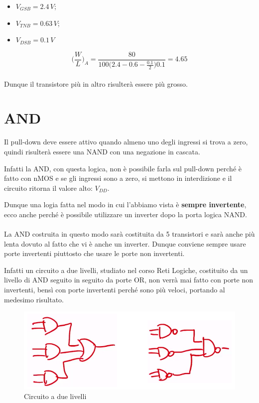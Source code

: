 \begin{itemize}
    \item $V_{GSB} = 2.4\,V$;
    \item $V_{TNB} =0.63\,V $;
    \item $V_{DSB} = 0.1\,V$
\end{itemize}


\begin{equation*}
    \biggl(\frac{W}{L}\biggl)_A = \frac{80}{100\big(2.4 - 0.6 - \frac{0.1}{2}\big)0.1} = 4.65
\end{equation*}

\paragraph{}
Dunque il transistore più in altro risulterà essere più grosso.

\newpage

\section{AND}
Il pull-down deve essere attivo quando almeno uno degli ingressi si trova a zero, quindi risulterà essere una NAND con una negazione in cascata.

Infatti la AND, con questa logica, non è possibile farla sul pull-down perché è fatto con nMOS e se gli ingressi sono a zero, si mettono in interdizione e il circuito ritorna il valore alto: $V_{DD}$.

Dunque una logia fatta nel modo in cui l'abbiamo vista è \textbf{sempre invertente}, ecco anche perché è possibile utilizzare un inverter dopo la porta logica NAND.

\paragraph{}
La AND costruita in questo modo sarà costituita da 5 transistori e sarà anche più lenta dovuto al fatto che vi è anche un inverter. Dunque conviene sempre usare porte invertenti piuttosto che usare le porte non invertenti.

Infatti un circuito a due livelli, studiato nel corso Reti Logiche, costituito da un livello di AND seguito in seguito da porte OR, non verrà mai fatto con porte non invertenti, bensì con porte invertenti perché sono più veloci, portando al medesimo risultato.

\begin{figure}[htbp]
    \centering
    \includegraphics[width=0.6\linewidth]{img/circ_due_livelli.png}
    \caption{Circuito a due livelli}    
\end{figure}

